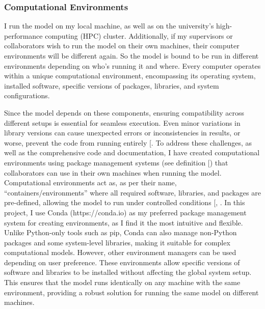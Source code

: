 \documentclass[
  11pt,
  letterpaper,
]{scrreprt}
\begin{document}
\subsubsection*{Computational
Environments}\label{computational-environments}

I run the model on my local machine, as well as on the university's
high-performance computing (HPC) cluster. Additionally, if my
supervisors or collaborators wish to run the model on their own
machines, their computer environments will be different again. So the
model is bound to be run in different environments depending on who's
running it and where. Every computer operates within a unique
computational environment, encompassing its operating system, installed
software, specific versions of packages, libraries, and system
configurations.

Since the model depends on these components, ensuring compatibility
across different setups is essential for seamless execution. Even minor
variations in library versions can cause unexpected errors or
inconsistencies in results, or worse, prevent the code from running
entirely {[}\citeproc{ref-spinellis2003Code}{383}{]}. To address these
challenges, as well as the comprehensive code and documentation, I have
created computational environments using package management systems (see
definition
{[}\citeproc{ref-turingwaycommunity2019TuringWayHandbook}{356}{]}) that
collaborators can use in their own machines when running the model.
Computational environments act as, as per their name,
``containers/environments'' where all required software, libraries, and
packages are pre-defined, allowing the model to run under controlled
conditions {[},
\citeproc{ref-maji2020Demystifying}{385}{]}. In this project, I use
Conda (https://conda.io) as my preferred package management system for
creating environments, as I find it the most intuitive and flexible.
Unlike Python-only tools such as pip, Conda can also manage non-Python
packages and some system-level libraries, making it suitable for complex
computational models. However, other environment managers can be used
depending on user preference. These environments allow specific versions
of software and libraries to be installed without affecting the global
system setup. This ensures that the model runs identically on any
machine with the same environment, providing a robust solution for
running the same model on different machines.
\end{document}
